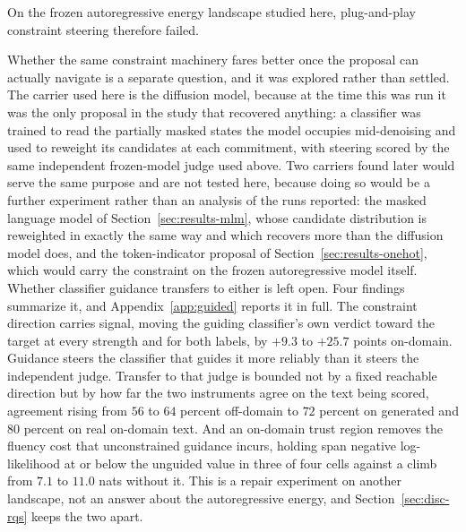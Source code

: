 On the frozen autoregressive energy landscape studied here, plug-and-play constraint steering therefore failed.

\label{sec:results-guided}
\label{sec:results-diffusion-guided} %

Whether the same constraint machinery fares better once the proposal can actually navigate is a separate question, and it was explored rather than settled. The carrier used here is the diffusion model, because at the time this was run it was the only proposal in the study that recovered anything: a classifier was trained to read the partially masked states the model occupies mid-denoising and used to reweight its candidates at each commitment, with steering scored by the same independent frozen-model judge used above. Two carriers found later would serve the same purpose and are not tested here, because doing so would be a further experiment rather than an analysis of the runs reported: the masked language model of Section~\ref{sec:results-mlm}, whose candidate distribution is reweighted in exactly the same way and which recovers more than the diffusion model does, and the token-indicator proposal of Section~\ref{sec:results-onehot}, which would carry the constraint on the frozen autoregressive model itself. Whether classifier guidance transfers to either is left open. Four findings summarize it, and Appendix~\ref{app:guided} reports it in full. The constraint direction carries signal, moving the guiding classifier's own verdict toward the target at every strength and for both labels, by $+9.3$ to $+25.7$ points on-domain. Guidance steers the classifier that guides it more reliably than it steers the independent judge. Transfer to that judge is bounded not by a fixed reachable direction but by how far the two instruments agree on the text being scored, agreement rising from $56$ to $64$ percent off-domain to $72$ percent on generated and $80$ percent on real on-domain text. And an on-domain trust region removes the fluency cost that unconstrained guidance incurs, holding span negative log-likelihood at or below the unguided value in three of four cells against a climb from $7.1$ to $11.0$ nats without it. This is a repair experiment on another landscape, not an answer about the autoregressive energy, and Section~\ref{sec:disc-rqs} keeps the two apart.



